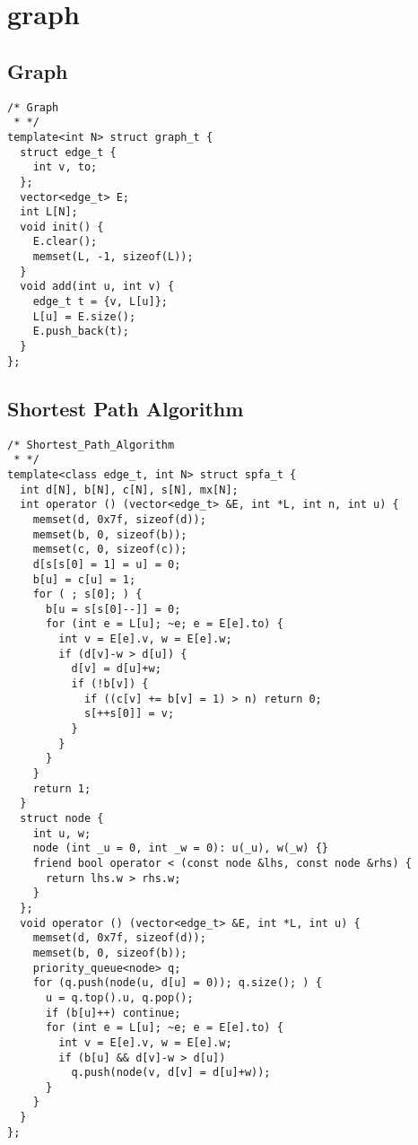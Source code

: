 
\section{graph}

\subsection{Graph}
\begin{lstlisting}
/* Graph
 * */
template<int N> struct graph_t {
  struct edge_t {
    int v, to;
  };
  vector<edge_t> E;
  int L[N];
  void init() {
    E.clear();
    memset(L, -1, sizeof(L));
  }
  void add(int u, int v) {
    edge_t t = {v, L[u]};
    L[u] = E.size();
    E.push_back(t);
  }
};
\end{lstlisting}


\subsection{Shortest Path Algorithm}
\begin{lstlisting}
/* Shortest_Path_Algorithm
 * */
template<class edge_t, int N> struct spfa_t {
  int d[N], b[N], c[N], s[N], mx[N];
  int operator () (vector<edge_t> &E, int *L, int n, int u) {
    memset(d, 0x7f, sizeof(d));
    memset(b, 0, sizeof(b));
    memset(c, 0, sizeof(c));
    d[s[s[0] = 1] = u] = 0;
    b[u] = c[u] = 1;
    for ( ; s[0]; ) {
      b[u = s[s[0]--]] = 0;
      for (int e = L[u]; ~e; e = E[e].to) {
        int v = E[e].v, w = E[e].w;
        if (d[v]-w > d[u]) {
          d[v] = d[u]+w;
          if (!b[v]) {
            if ((c[v] += b[v] = 1) > n) return 0;
            s[++s[0]] = v;
          }
        }
      }
    }
    return 1;
  }
  struct node {
    int u, w;
    node (int _u = 0, int _w = 0): u(_u), w(_w) {}
    friend bool operator < (const node &lhs, const node &rhs) {
      return lhs.w > rhs.w;
    }
  };
  void operator () (vector<edge_t> &E, int *L, int u) {
    memset(d, 0x7f, sizeof(d));
    memset(b, 0, sizeof(b));
    priority_queue<node> q;
    for (q.push(node(u, d[u] = 0)); q.size(); ) {
      u = q.top().u, q.pop();
      if (b[u]++) continue;
      for (int e = L[u]; ~e; e = E[e].to) {
        int v = E[e].v, w = E[e].w;
        if (b[u] && d[v]-w > d[u])
          q.push(node(v, d[v] = d[u]+w));
      }
    }
  }
};
\end{lstlisting}


